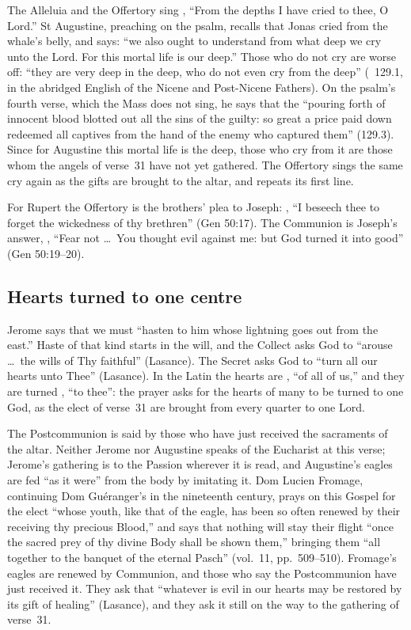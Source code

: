 The Alleluia and the Offertory sing , ``From the depths I have cried to thee, O Lord.'' St Augustine,
preaching on the psalm, recalls that Jonas cried from the whale's belly, and
says: ``we also ought to understand from what deep we cry unto the Lord. For
this mortal life is our deep.'' Those who do not cry are worse off: ``they are
very deep in the deep, who do not even cry from the deep'' (~129.1, in the abridged English of the Nicene and Post-Nicene
Fathers). On the psalm's fourth verse, which the Mass does not sing, he says
that the ``pouring forth of innocent blood blotted out all the sins of the
guilty: so great a price paid down redeemed all captives from the hand of the
enemy who captured them'' (129.3). Since for Augustine this mortal life is
the deep, those who cry from it are those whom the angels of verse~31 have not
yet gathered.
The Offertory sings the same cry again as the gifts are brought to the altar,
and repeats its first line.

For Rupert the Offertory is the brothers' plea to Joseph: , ``I beseech thee to forget the wickedness of
thy brethren'' (Gen 50:17). The Communion is Joseph's answer, , ``Fear not
\dots\ You thought evil against me: but God turned it into good'' (Gen
50:19--20).

\subsection{Hearts turned to one centre}
\label{sec:body-orations}

Jerome says that we must ``hasten to him whose lightning goes out from the
east.'' Haste of that kind starts in the will, and the Collect asks God to
``arouse \dots\ the wills of Thy faithful'' (Lasance). The Secret asks God to
``turn all our hearts unto Thee'' (Lasance). In the Latin the hearts are
, ``of all of us,'' and they are turned ,
``to thee'': the prayer asks for the hearts of many to be turned to one God,
as the elect of verse~31 are brought from every quarter to one Lord.

The Postcommunion is said by those who have just received the sacraments of
the altar. Neither Jerome nor Augustine speaks of the Eucharist at this verse;
Jerome's gathering is to the Passion wherever it is read, and Augustine's
eagles are fed ``as it were'' from the body by imitating it. Dom Lucien
Fromage, continuing Dom Guéranger's  in the
nineteenth century, prays on this Gospel for the elect ``whose youth, like that of the
eagle, has been so often renewed by their receiving thy precious Blood,'' and
says that nothing will stay their flight ``once the sacred prey of thy divine
Body shall be shown them,'' bringing them ``all together to the banquet of the
eternal Pasch'' (vol.~11, pp.~509--510). Fromage's eagles are renewed by
Communion, and those who say the Postcommunion have just received it. They
ask that ``whatever is evil in our hearts may be restored by its gift of
healing'' (Lasance), and they ask it still on the way to the gathering of
verse~31.

